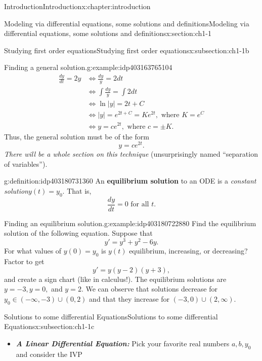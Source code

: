\documentclass[oneside,10pt,]{book}
\newcommand{\alert}[1]{\textbf{\textit{#1}}}
\newcommand{\terminology}[1]{\textbf{#1}}
\numberwithin{equation}{section}
\numberwithin{equation}{section}
\newcommand{\amp}{&}
\begin{document}
\begin{chapterptx}{Introduction}{}{Introduction}{}{}{x:chapter:introduction}
\begin{sectionptx}{Modeling via differential equations, some solutions and definitions}{}{Modeling via differential equations, some solutions and definitions}{}{}{x:section:ch1-1}
\begin{subsectionptx}{Studying first order equations}{}{Studying first order equations}{}{}{x:subsection:ch1-1b}
\begin{example}{Finding a general solution.}{g:example:idp403163765104}
\begin{align*}
\frac{dy}{dt}=2y \amp \iff\frac{dy}{y}=2dt\\
\amp \iff\int\frac{dy}{y}=\int2dt\\
\amp \iff\ln\left|y\right|=2t+C\\
\amp \iff\left|y\right|=e^{2t+C}=Ke^{2t},\text{ where }K=e^{C}\\
\amp \iff y=ce^{2t},\text{ where }c=\pm K.
\end{align*}
Thus, the general solution must be of the form%
\begin{equation*}
y = ce^{2t}.
\end{equation*}
\emph{There will be a whole section on this technique} (unsurprisingly named ``separation of variables'').\end{example}
\begin{definition}{}{g:definition:idp403180731360}%
An \terminology{equilibrium solution} to an ODE is a \emph{constant solution}\(y(t) = y_0\). That is,%
\begin{equation*}
\frac{dy}{dt} = 0 \text{ for all } t.
\end{equation*}
\end{definition}
\begin{example}{Finding an equilibrium solution.}{g:example:idp403180722880}%
 Find the equilibrium solution of the following equation. Suppose that%
\begin{equation*}
y' = y^3 + y^2 - 6y.
\end{equation*}
For what values of \(y(0) = y_0\) is \(y(t)\) equilibrium, increasing, or decreasing? Factor to get%
\begin{equation*}
y' = y(y-2)(y+3),
\end{equation*}
and create a sign chart (like in calculus!). The equilibrium solutions are \(y = -3, y=0,\) and \(y=2\). We can observe that solutions decrease for \(y_0 \in (-\infty, -3)\cup(0,2)\) and that they increase for \((-3,0)\cup(2,\infty)\).\end{example}
\end{subsectionptx}
%
%
\typeout{************************************************}
\typeout{************************************************}
%
\begin{subsectionptx}{Solutions to some differential Equations}{}{Solutions to some differential Equations}{}{}{x:subsection:ch1-1c}
%
\begin{itemize}[label=\textbullet]
\item{}\alert{A Linear Differential Equation:} Pick your favorite real numbers \(a,b,y_{0}\) and consider the IVP%

\end{itemize}
\end{subsectionptx}
\end{sectionptx}
\end{chapterptx}
\end{document}
